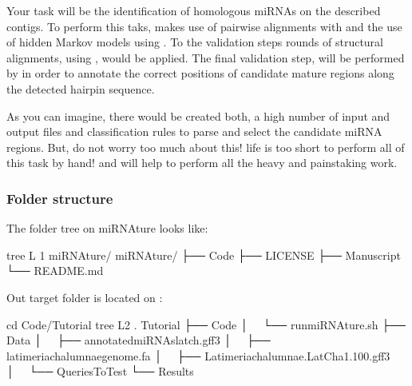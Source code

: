 \documentclass[letterpaper,10pt,english]{sphinxmanual}
\begin{document}
Your task will be the identification of homologous miRNAs on the described
contigs. To perform this taks,  makes use of pairwise alignments
with  and the use of hidden Markov models using . To the
validation steps rounds of structural alignments, using , would be
applied. The final validation step, will be performed by  in order to
annotate the correct positions of candidate mature regions along the detected
hairpin sequence.

As you can imagine, there would be created both, a high number of input and output
files and classification rules to parse and select the candidate miRNA regions.
But, do not worry too much about this! life is too short to perform all of this
task by hand! and  will help to perform all the heavy and
painstaking work.


\subsubsection{Folder structure}
\label{\detokenize{tutorial:folder-structure}}
The folder tree on miRNAture looks like:

\begin{sphinxVerbatim}[commandchars=\\\{\}]
\PYGZdl{} tree \PYGZhy{}L 1 miRNAture/
miRNAture/
├── Code
├── LICENSE
├── Manuscript
└── README.md
\end{sphinxVerbatim}

Out target folder is located on :

\begin{sphinxVerbatim}[commandchars=\\\{\}]
\PYGZdl{} cd Code/Tutorial
\PYGZdl{} tree \PYGZhy{}L2 .
Tutorial
├── Code
│   └── run\PYGZus{}miRNAture.sh
├── Data
│   ├── annotated\PYGZus{}miRNAs\PYGZus{}latch.gff3
│   ├── latimeria\PYGZus{}chalumnae\PYGZus{}genome.fa
│   ├── Latimeria\PYGZus{}chalumnae.LatCha1.100.gff3
│   └── QueriesToTest
└── Results
\end{sphinxVerbatim}
\end{document}
